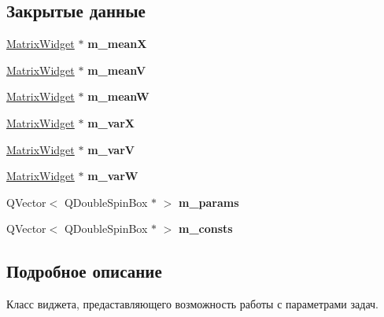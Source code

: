 \subsection*{Закрытые данные}
\begin{DoxyCompactItemize}
\item 
\hypertarget{class_task_parameters_widget_ac36859f80fae601b1a32a8c42e86f742}{}\label{class_task_parameters_widget_ac36859f80fae601b1a32a8c42e86f742} 
\hyperlink{class_matrix_widget}{Matrix\+Widget} $\ast$ {\bfseries m\+\_\+meanX}
\item 
\hypertarget{class_task_parameters_widget_a3c354b8ddd6fe09355c8821b4b522887}{}\label{class_task_parameters_widget_a3c354b8ddd6fe09355c8821b4b522887} 
\hyperlink{class_matrix_widget}{Matrix\+Widget} $\ast$ {\bfseries m\+\_\+meanV}
\item 
\hypertarget{class_task_parameters_widget_ac14cb83595acb2c63fe24ccde0c1d3bb}{}\label{class_task_parameters_widget_ac14cb83595acb2c63fe24ccde0c1d3bb} 
\hyperlink{class_matrix_widget}{Matrix\+Widget} $\ast$ {\bfseries m\+\_\+meanW}
\item 
\hypertarget{class_task_parameters_widget_a758d6df3d1413839119f412bd32a0ec1}{}\label{class_task_parameters_widget_a758d6df3d1413839119f412bd32a0ec1} 
\hyperlink{class_matrix_widget}{Matrix\+Widget} $\ast$ {\bfseries m\+\_\+varX}
\item 
\hypertarget{class_task_parameters_widget_a1135f640b291c25931f0f919a97487d0}{}\label{class_task_parameters_widget_a1135f640b291c25931f0f919a97487d0} 
\hyperlink{class_matrix_widget}{Matrix\+Widget} $\ast$ {\bfseries m\+\_\+varV}
\item 
\hypertarget{class_task_parameters_widget_a94e809377fb4de3f4f61b30e38fcbf12}{}\label{class_task_parameters_widget_a94e809377fb4de3f4f61b30e38fcbf12} 
\hyperlink{class_matrix_widget}{Matrix\+Widget} $\ast$ {\bfseries m\+\_\+varW}
\item 
\hypertarget{class_task_parameters_widget_a2fac0e19d14d82f45532ca2f328cadd8}{}\label{class_task_parameters_widget_a2fac0e19d14d82f45532ca2f328cadd8} 
Q\+Vector$<$ Q\+Double\+Spin\+Box $\ast$ $>$ {\bfseries m\+\_\+params}
\item 
\hypertarget{class_task_parameters_widget_aefe5f25cdbc68d21a95b915a39352f51}{}\label{class_task_parameters_widget_aefe5f25cdbc68d21a95b915a39352f51} 
Q\+Vector$<$ Q\+Double\+Spin\+Box $\ast$ $>$ {\bfseries m\+\_\+consts}
\end{DoxyCompactItemize}


\subsection{Подробное описание}
Класс виджета, предаставляющего возможность работы с параметрами задач. 

